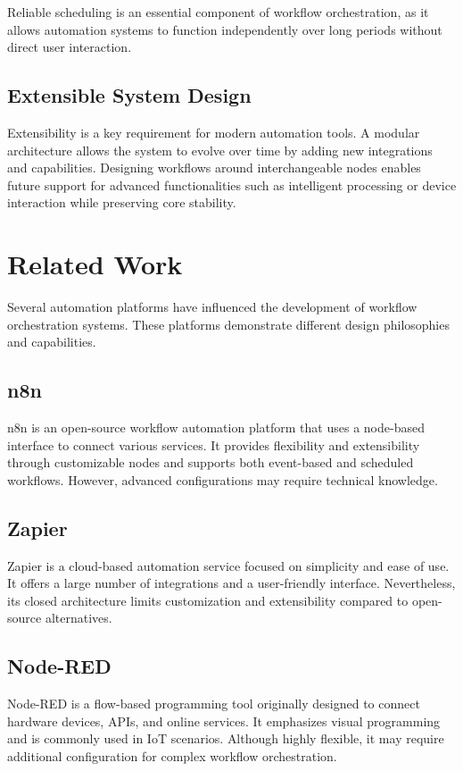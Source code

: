 Reliable scheduling is an essential component of workflow orchestration, as it allows automation systems to function independently over long periods without direct user interaction.

\subsection{Extensible System Design}
Extensibility is a key requirement for modern automation tools. A modular architecture allows the system to evolve over time by adding new integrations and capabilities. Designing workflows around interchangeable nodes enables future support for advanced functionalities such as intelligent processing or device interaction while preserving core stability.

\section{Related Work}

Several automation platforms have influenced the development of workflow orchestration systems. These platforms demonstrate different design philosophies and capabilities.

\subsection{n8n}
n8n is an open-source workflow automation platform that uses a node-based interface to connect various services. It provides flexibility and extensibility through customizable nodes and supports both event-based and scheduled workflows. However, advanced configurations may require technical knowledge.

\subsection{Zapier}
Zapier is a cloud-based automation service focused on simplicity and ease of use. It offers a large number of integrations and a user-friendly interface. Nevertheless, its closed architecture limits customization and extensibility compared to open-source alternatives.

\subsection{Node-RED}
Node-RED is a flow-based programming tool originally designed to connect hardware devices, APIs, and online services. It emphasizes visual programming and is commonly used in IoT scenarios. Although highly flexible, it may require additional configuration for complex workflow orchestration.

